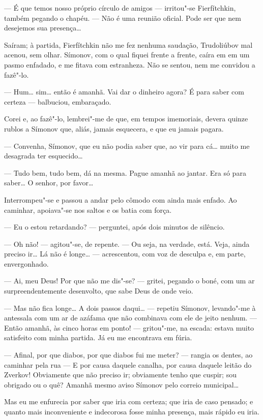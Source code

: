 --- É que temos nosso próprio círculo de amigos --- irritou"-se
Fierfítchkin, também pegando o chapéu. --- Não é uma reunião oficial. Pode
ser que nem desejemos sua presença\ldots{}

Saíram; à partida, Fierfítchkin não me fez nenhuma saudação, Trudoliúbov
mal acenou, sem olhar. Símonov, com o qual fiquei frente a frente, caíra
em em um pasmo enfadado, e me fitava com estranheza. Não se sentou, nem
me convidou a fazê"-lo.

--- Hum\ldots{} sim\ldots{} então é amanhã. Vai dar o dinheiro agora? É para saber
com certeza --- balbuciou, embaraçado.

Corei e, ao fazê"-lo, lembrei"-me de que, em tempos imemoriais, devera
quinze rublos a Símonov que, aliás, jamais esquecera, e que eu jamais
pagara.

--- Convenha, Símonov, que eu não podia saber que, ao vir para cá\ldots{} muito
me desagrada ter esquecido\ldots{}

--- Tudo bem, tudo bem, dá na mesma. Pague amanhã ao jantar. Era só para
saber\ldots{} O senhor, por favor\ldots{}

Interrompeu"-se e passou a andar pelo cômodo com ainda mais enfado. Ao
caminhar, apoiava"-se nos saltos e os batia com força.

--- Eu o estou retardando? --- perguntei, após dois minutos de silêncio.

--- Oh não! --- agitou"-se, de repente. --- Ou seja, na verdade, está. Veja,
ainda preciso ir\ldots{} Lá não é longe\ldots{} --- acrescentou, com voz de desculpa
e, em parte, envergonhado.

--- Ai, meu Deus! Por que não me dis"-se? --- gritei, pegando o boné, com um
ar surpreendentemente desenvolto, que sabe Deus de onde veio.

--- Mas não fica longe\ldots{} A dois passos daqui\ldots{} --- repetiu Símonov,
levando"-me à antessala com um ar de azáfama que não combinava com ele de
jeito nenhum. --- Então amanhã, às cinco horas em ponto! --- gritou"-me, na
escada: estava muito satisfeito com minha partida. Já eu me encontrava
em fúria.

--- Afinal, por que diabos, por que diabos fui me meter? --- rangia os
dentes, ao caminhar pela rua --- E por causa daquele canalha, por causa
daquele leitão do Zverkov! Obviamente que não preciso ir; obviamente
tenho que cuspir; sou obrigado ou o quê? Amanhã mesmo aviso Símonov pelo
correio municipal\ldots{}

Mas eu me enfurecia por saber que iria com certeza; que iria de caso
pensado; e quanto mais inconveniente e indecorosa fosse minha presença,
mais rápido eu iria.


